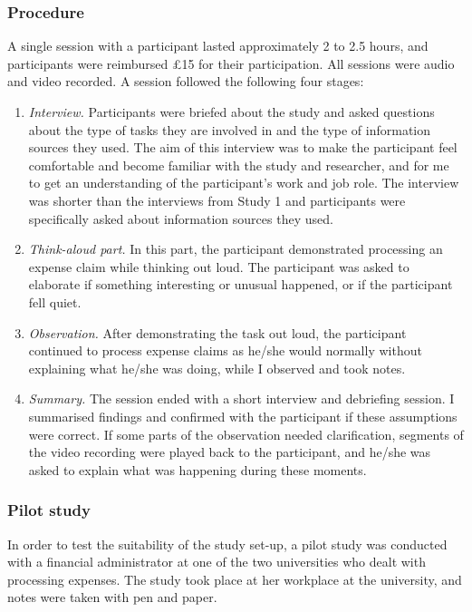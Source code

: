 \subsubsection{Procedure}
A single session with a participant lasted approximately 2 to 2.5 hours, and participants were reimbursed \pounds 15 for their participation. All sessions were audio and video recorded. A session followed the following four stages:

\begin{enumerate}
\item 
\textit{Interview.} Participants were briefed about the study and asked questions about the type of tasks they are involved in and the type of information sources they used. The aim of this interview was to make the participant feel comfortable and become familiar with the study and researcher, and for me to get an understanding of the participant’s work and job role. The interview was shorter than the interviews from Study 1 and participants were specifically asked about information sources they used.
\item 
\textit{Think-aloud part.}  In this part, the participant demonstrated processing an expense claim while thinking out loud. The participant was asked to elaborate if something interesting or unusual happened, or if the participant fell quiet.
\item 
\textit{Observation.}
After demonstrating the task out loud, the participant continued to process expense claims as he/she would normally without explaining what he/she was doing, while I observed and took notes.
\item 
\textit{Summary.} The session ended with a short interview and debriefing session. I summarised findings and confirmed with the participant if these assumptions were correct. If some parts of the observation needed clarification, segments of the video recording were played back to the participant, and he/she was asked to explain what was happening during these moments.
\end{enumerate}

\subsubsection{Pilot study}
In order to test the suitability of the study set-up, a pilot study was conducted with a financial administrator at one of the two universities who dealt with processing expenses. The study took place at her workplace at the university, and notes were taken with pen and paper. 

